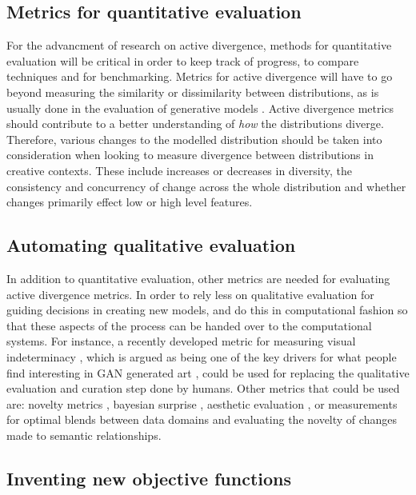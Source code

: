 \subsection{Metrics for quantitative evaluation}

For the advancment of research on active divergence, methods for quantitative evaluation will be critical in order to keep track of progress, to compare techniques and for benchmarking. Metrics for active divergence will have to go beyond measuring the similarity or dissimilarity between distributions, as is usually done in the evaluation of generative models \citep{gretton2019interpretable}. Active divergence metrics should contribute to a better understanding of \textit{how} the distributions diverge. Therefore, various changes to the modelled distribution should be taken into consideration when looking to measure divergence between distributions in creative contexts. These include increases or decreases in diversity, the consistency and concurrency of change across the whole distribution and whether changes primarily effect low or high level features.

\subsection{Automating qualitative evaluation}

In addition to quantitative evaluation, other metrics are needed for evaluating active divergence metrics. In order to rely less on qualitative evaluation for guiding decisions in creating new models, and do this in computational fashion so that these aspects of the process can be handed over to the computational systems. For instance, a recently developed metric for measuring visual indeterminacy \citep{wang2020towards}, which is argued as being one of the key drivers for what people find interesting in GAN generated art \citep{hertzmann2020visual}, could be used for replacing the qualitative evaluation and curation step done by humans. Other metrics that could be used are: novelty metrics \citep{grace2019expectation}, bayesian surprise \citep{itti2009bayesian}, aesthetic evaluation \citep{galanter2012computational}, or measurements for optimal blends between data domains and evaluating the novelty of changes made to semantic relationships.

\subsection{Inventing new objective functions}

